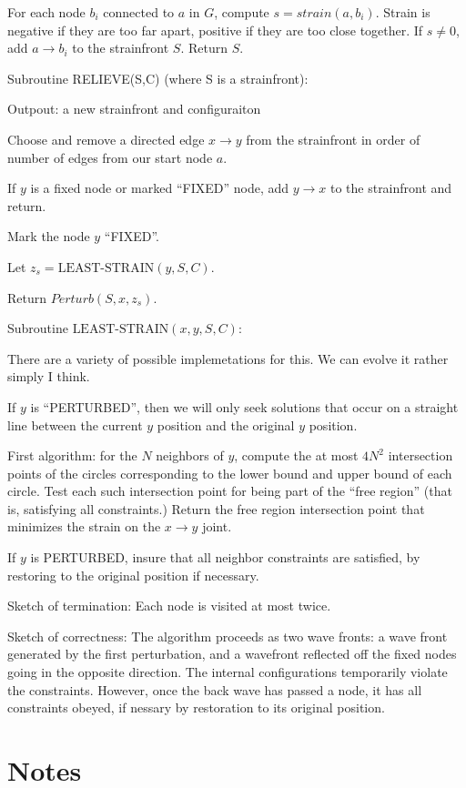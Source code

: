 \documentclass[11pt]{article}
\begin{document}
For each node $b_i$ connected  to $a$ in $G$,
compute $s = strain(a,b_i)$. Strain is negative if they are too far apart,
positive if they are too close together.
If $s \neq 0$, add  $a \rightarrow b_i$ to the strainfront $S$. Return $S$.

Subroutine RELIEVE(S,C) (where S is a strainfront):

Outpout: a new strainfront and configuraiton

Choose and remove a directed edge $x \rightarrow y$ from the strainfront in order
of number of edges from our start node $a$.

If $y$ is a fixed node or marked ``FIXED'' node, add $y \rightarrow x$ to the strainfront and return.

Mark the node $y$ ``FIXED''.

Let $z_s = \text{LEAST-STRAIN}(y,S,C)$.

Return $Perturb(S,x,z_s)$.

Subroutine $\text{LEAST-STRAIN}(x,y,S,C)$:

There are a variety of possible implemetations for this.  We can evolve it
rather simply I think.

If $y$ is ``PERTURBED'', then we will only seek solutions that occur on a straight line
between the current $y$ position and the original $y$ position.

First algorithm: for the $N$ neighbors of $y$, compute the at most $4N^2$ intersection points
of the circles corresponding to the lower bound and upper bound of each circle. Test
each such intersection point for being part of the ``free region'' (that is, satisfying all
constraints.)  Return the free region intersection point that minimizes the strain on the
$x \rightarrow y$ joint.

If $y$ is PERTURBED, insure that all neighbor constraints are satisfied, by restoring
to the original position if necessary.



Sketch of termination:
Each node is visited at most twice.

Sketch of correctness:
The algorithm proceeds as two wave fronts: a wave front generated by the first perturbation,
and a wavefront reflected off the fixed nodes going in the opposite direction. The
internal configurations temporarily violate the constraints.  However, once the back
wave has passed a node, it has all constraints obeyed, if nessary by restoration to its
original position.

\section{Notes}
\end{document}
